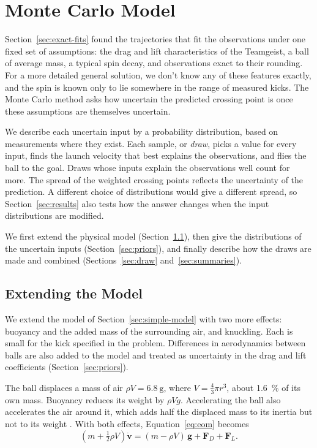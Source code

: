 \documentclass[10pt,a4paper]{article}
\begin{document}
\section{Monte Carlo Model}
\label{sec:montecarlo}

Section~\ref{sec:exact-fits} found the trajectories that fit the observations
under one fixed set of assumptions: the drag and lift characteristics of the Teamgeist, a ball of
average mass, a typical spin decay, and observations exact to their rounding.
For a more detailed general solution, we don't know any of these features exactly, and the spin is known only to lie somewhere in
the range of measured kicks. The Monte Carlo method asks how uncertain the
predicted crossing point is once these assumptions are themselves uncertain.

We describe each uncertain input by a probability distribution, based on
measurements where they exist. Each sample, or \emph{draw}, picks a value for
every input, finds the launch velocity that best explains the observations,
and flies the ball to the goal. Draws whose inputs explain the observations
well count for more. The spread of the weighted crossing points reflects the
uncertainty of the prediction. A
different choice of distributions would give a different spread, so
Section~\ref{sec:results} also tests how the answer changes when the input
distributions are modified.

We first extend the physical model (Section~\ref{sec:variants}), then give the
distributions of the uncertain inputs (Section~\ref{sec:priors}), and finally
describe how the draws are made and combined (Sections~\ref{sec:draw}
and~\ref{sec:summaries}).

\subsection{Extending the Model}
\label{sec:variants}

We extend the model of Section~\ref{sec:simple-model} with two more effects:
buoyancy and the added mass of the surrounding air, and knuckling. Each is
small for the kick specified in the problem. Differences in aerodynamics between balls are also added to the model and  treated as
uncertainty in the drag and lift coefficients (Section~\ref{sec:priors}).

The ball displaces a mass of air
$\rho V = \SI{6.8}{\gram}$, where $V = \tfrac{4}{3}\pi r^3$, about
\SI{1.6}{\percent} of its own mass. Buoyancy reduces its weight by $\rho V g$.
Accelerating the ball also accelerates the air around it, which adds half the
displaced mass to its inertia but not to its weight \citep{batchelor1967}.
With both effects, Equation~\eqref{eq:eom} becomes
\begin{equation}
  \left(m + \tfrac{1}{2}\rho V\right) \dot{\bm{v}}
  = (m - \rho V)\,\bm{g} + \bm{F}_D + \bm{F}_L .
  \label{eq:eom-air}
\end{equation}
\end{document}
